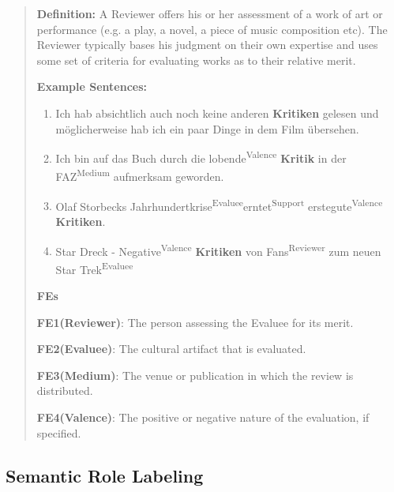 \documentclass[12pt]{article}
\begin{document}
\begin{quote}
\textbf{Definition:}
A Reviewer offers his or her assessment of a work of art or performance (e.g. a play, a novel, a piece of music composition etc). The Reviewer typically bases his judgment on their own expertise and uses some set of criteria for evaluating works as to their relative merit.

\textbf{Example Sentences:}
\begin{enumerate}
\item Ich hab absichtlich auch noch keine anderen \textbf{Kritiken} gelesen und möglicherweise hab ich ein paar Dinge in dem Film übersehen.
\item Ich bin auf das Buch durch die \lbrack lobende\rbrack \textsuperscript{Valence} \textbf{Kritik} \lbrack in der FAZ\rbrack \textsuperscript{Medium} aufmerksam geworden.
\item \lbrack Olaf Storbecks Jahrhundertkrise\rbrack\textsuperscript{Evaluee}\lbrack erntet\rbrack\textsuperscript{Support} erste\lbrack gute\rbrack \textsuperscript{Valence} \textbf{Kritiken}.
\item Star Dreck - \lbrack Negative\rbrack \textsuperscript{Valence} \textbf{Kritiken} \lbrack von Fans\rbrack \textsuperscript{Reviewer}  \lbrack zum neuen Star Trek\rbrack \textsuperscript{Evaluee}
\end{enumerate}


\textbf{FEs}

\textbf{FE1(Reviewer)}: The person assessing the Evaluee for its merit.

\textbf{FE2(Evaluee)}: The cultural artifact that is evaluated.

\textbf{FE3(Medium)}: The venue or publication in which the review is distributed.

\textbf{FE4(Valence)}: The positive or negative nature of the evaluation, if specified. 
\end{quote}

\subsection{Semantic Role Labeling}\label{subsec:introduction_SRL}
\end{document}
